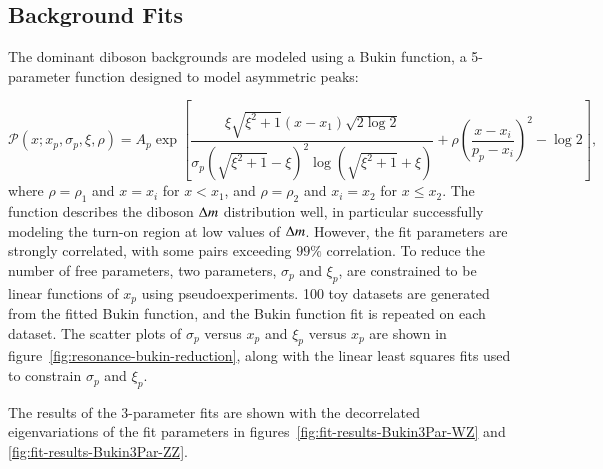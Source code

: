 \clearpage

\subsection{Background Fits}\label{sec:resonance-background-model}
The dominant diboson backgrounds are modeled using a Bukin function, a 5-parameter function designed to model asymmetric peaks:

\begin{equation}
\mathcal{P}(x;x_p ,\sigma_p, \xi ,\rho)=A_p \exp \left [ \frac{\xi \sqrt{\xi^2+1} (x-x_1) \sqrt{2\log2}}{\sigma_p(\sqrt{\xi^2+1}-\xi)^2 \log (\sqrt{\xi^2+1}+\xi)}+ \rho( \frac{x-x_i}{p_p-x_i})^2 - \log2\right ] ,
\end{equation}
where $\rho = \rho_1$ and $x = x_i$ for $x < x_1$, and $\rho = \rho_2$ and $x_i = x_2$ for $x \leq x_2$. The function describes the diboson $\Delta m$ distribution well, in particular successfully modeling the turn-on region at low values of $\Delta m$. However, the fit parameters are strongly correlated, with some pairs exceeding $99\%$ correlation. To reduce the number of free parameters, two parameters, $\sigma_p$ and $\xi_p$, are constrained to be linear functions of $x_p$ using pseudoexperiments. 100 toy datasets are generated from the fitted Bukin function, and the Bukin function fit is repeated on each dataset. The scatter plots of $\sigma_p$ versus $x_p$ and $\xi_p$ versus $x_p$ are shown in figure~\ref{fig:resonance-bukin-reduction}, along with the linear least squares fits used to constrain $\sigma_p$ and $\xi_p$. 

The results of the 3-parameter fits are shown with the decorrelated eigenvariations of the fit parameters in figures~\ref{fig:fit-results-Bukin3Par-WZ} and \ref{fig:fit-results-Bukin3Par-ZZ}. 

